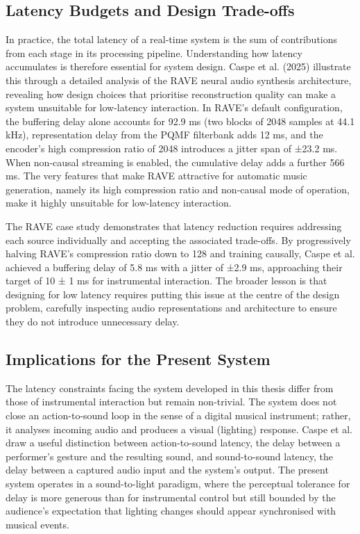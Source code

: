 \subsection{Latency Budgets and Design Trade-offs}

In practice, the total latency of a real-time system is the sum of contributions from each stage in its processing pipeline. Understanding how latency accumulates is therefore essential for system design. Caspe et al. (2025) illustrate this through a detailed analysis of the RAVE neural audio synthesis architecture, revealing how design choices that prioritise reconstruction quality can make a system unsuitable for low-latency interaction. In RAVE's default configuration, the buffering delay alone accounts for 92.9 ms (two blocks of 2048 samples at 44.1 kHz), representation delay from the PQMF filterbank adds 12 ms, and the encoder's high compression ratio of 2048 introduces a jitter span of ±23.2 ms.\cite{caspe2025designing}  When non-causal streaming is enabled, the cumulative delay adds a further 566 ms.\cite{caspe2025designing}  The very features that make RAVE attractive for automatic music generation, namely its high compression ratio and non-causal mode of operation, make it highly unsuitable for low-latency interaction.

The RAVE case study demonstrates that latency reduction requires addressing each source individually and accepting the associated trade-offs. By progressively halving RAVE's compression ratio down to 128 and training causally, Caspe et al. achieved a buffering delay of 5.8 ms with a jitter of ±2.9 ms, approaching their target of 10 ± 1 ms for instrumental interaction.\cite{caspe2025designing}  The broader lesson is that designing for low latency requires putting this issue at the centre of the design problem, carefully inspecting audio representations and architecture to ensure they do not introduce unnecessary delay.\cite{caspe2025designing} 

\subsection{Implications for the Present System}

The latency constraints facing the system developed in this thesis differ from those of instrumental interaction but remain non-trivial. The system does not close an action-to-sound loop in the sense of a digital musical instrument; rather, it analyses incoming audio and produces a visual (lighting) response. Caspe et al. draw a useful distinction between action-to-sound latency, the delay between a performer's gesture and the resulting sound, and sound-to-sound latency, the delay between a captured audio input and the system's output.\cite{caspe2025designing}  The present system operates in a sound-to-light paradigm, where the perceptual tolerance for delay is more generous than for instrumental control but still bounded by the audience's expectation that lighting changes should appear synchronised with musical events.

